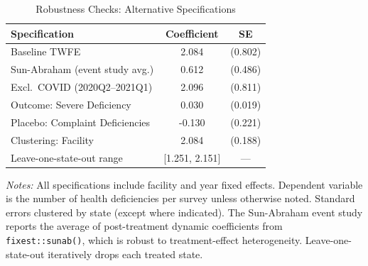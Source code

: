 \begin{table}[htbp]
\centering
\caption{Robustness Checks: Alternative Specifications}
\label{tab:robustness}
\begin{tabular}{lcc}
\hline\hline
Specification & Coefficient & SE \\
\hline
Baseline TWFE & 2.084 & (0.802) \\
Sun-Abraham (event study avg.) & 0.612 & (0.486) \\
Excl.\ COVID (2020Q2--2021Q1) & 2.096 & (0.811) \\
Outcome: Severe Deficiency & 0.030 & (0.019) \\
Placebo: Complaint Deficiencies & -0.130 & (0.221) \\
Clustering: Facility & 2.084 & (0.188) \\
Leave-one-state-out range & [1.251, 2.151] & --- \\
\hline\hline
\end{tabular}
\begin{tablenotes}[flushleft]
\small
\item \textit{Notes:} All specifications include facility and year fixed effects. Dependent variable is the number of health deficiencies per survey unless otherwise noted. Standard errors clustered by state (except where indicated). The Sun-Abraham event study reports the average of post-treatment dynamic coefficients from \texttt{fixest::sunab()}, which is robust to treatment-effect heterogeneity. Leave-one-state-out iteratively drops each treated state.
\end{tablenotes}
\end{table}
